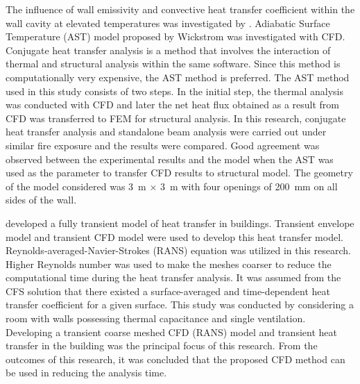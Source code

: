 The influence of wall emissivity and convective heat transfer coefficient within the wall cavity at elevated temperatures was investigated by \citet{Andreozzi2013}. Adiabatic Surface Temperature (AST) model proposed by Wickstrom was investigated with CFD. Conjugate heat transfer analysis is a method that involves the interaction of thermal and structural analysis within the same software. Since this method is computationally very expensive, the AST method is preferred. The AST method used in this study consists of two steps. In the initial step, the thermal analysis was conducted with CFD and later the net heat flux obtained as a result from CFD was transferred to FEM for structural analysis. In this research, conjugate heat transfer analysis and standalone beam analysis were carried out under similar fire exposure and the results were compared. Good agreement was observed between the experimental results and the model when the AST was used as the parameter to transfer CFD results to structural model. The geometry of the model considered was 3~m \(\times\) 3~m with four openings of 200~mm on all sides of the wall.

\citet{Arendt2014} developed a fully transient model of heat transfer in buildings. Transient envelope model and transient CFD model were used to develop this heat transfer model. Reynolds-averaged-Navier-Strokes (RANS) equation was utilized in this research. Higher Reynolds number was used to make the meshes coarser to reduce the computational time during the heat transfer analysis. It was assumed from the CFS solution that there existed a surface-averaged and time-dependent heat transfer coefficient for a given surface. This study was conducted by considering a room with walls possessing thermal capacitance and single ventilation. Developing a transient coarse meshed CFD (RANS) model and transient heat transfer in the building was the principal focus of this research. From the outcomes of this research, it was concluded that the proposed CFD method can be used in reducing the analysis time.


